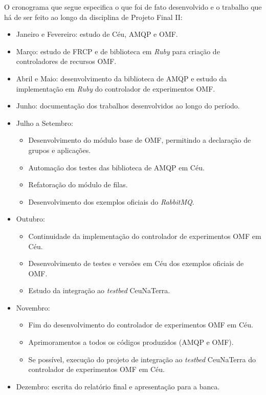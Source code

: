 O cronograma que segue especifica o que foi de fato desenvolvido e o trabalho que há de ser feito ao longo da disciplina de Projeto Final II:
\begin{itemize}  
\item Janeiro e Fevereiro: estudo de Céu, AMQP e OMF.
\item Março: estudo de FRCP e de biblioteca em \textit{Ruby} para criação de controladores de recursos OMF.
\item Abril e Maio: desenvolvimento da biblioteca de AMQP e estudo da implementação em \textit{Ruby} do controlador de experimentos OMF.
\item Junho: documentação dos trabalhos desenvolvidos ao longo do período.
\item Julho a Setembro:
  \begin{itemize}  
  \item Desenvolvimento do módulo base de OMF, permitindo a declaração de grupos e aplicações.
  \item Automação dos testes das biblioteca de AMQP em Céu.
  \item Refatoração do módulo de filas.
  \item Desenvolvimento dos exemplos oficiais do \textit{RabbitMQ}.
  \end{itemize}
\item Outubro: 
  \begin{itemize}  
  \item Continuidade da implementação do controlador de experimentos OMF em Céu.
  \item Desenvolvimento de testes e versões em Céu dos exemplos oficiais de OMF.
  \item Estudo da integração ao \textit{testbed} CeuNaTerra.
  \end{itemize}
\item Novembro: 
  \begin{itemize}  
  \item Fim do desenvolvimento do controlador de experimentos OMF em Céu.
  \item Aprimoramentos a todos os códigos produzidos (AMQP e OMF).
  \item Se possível, execução do projeto de integração ao \textit{testbed} CeuNaTerra do controlador de experimentos OMF em Céu.
  \end{itemize}
\item Dezembro: escrita do relatório final e apresentação para a banca.
\end{itemize}
